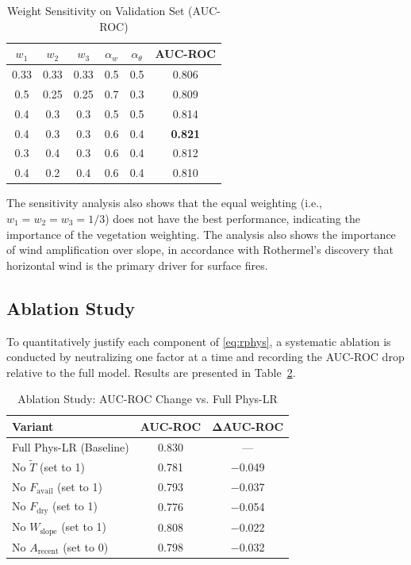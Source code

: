 \documentclass[conference]{IEEEtran}
\begin{document}
\begin{table}[h]
\caption{Weight Sensitivity on Validation Set (AUC-ROC)}
\label{tab:weights}
\centering
\small
\begin{tabular}{|c|c|c|c|c|c|}
\hline
$w_1$ & $w_2$ & $w_3$ & $\alpha_w$ & $\alpha_\theta$ & \textbf{AUC-ROC} \\
\hline
0.33 & 0.33 & 0.33 & 0.5 & 0.5 & 0.806 \\
0.5  & 0.25 & 0.25 & 0.7 & 0.3 & 0.809 \\
0.4  & 0.3  & 0.3  & 0.5 & 0.5 & 0.814 \\
0.4  & 0.3  & 0.3  & 0.6 & 0.4 & \textbf{0.821} \\
0.3  & 0.4  & 0.3  & 0.6 & 0.4 & 0.812 \\
0.4  & 0.2  & 0.4  & 0.6 & 0.4 & 0.810 \\
\hline
\end{tabular}
\end{table}

The sensitivity analysis also shows that the equal weighting (i.e., $w_1 = w_2 = w_3 = 1/3$) does not have the best performance, indicating the importance of the vegetation weighting. The analysis also shows the importance of wind amplification over slope, in accordance with Rothermel's discovery that horizontal wind is the primary driver for surface fires.

\subsection{Ablation Study}

To quantitatively justify each component of \eqref{eq:rphys}, a systematic ablation is conducted by neutralizing one factor at a time and recording the AUC-ROC drop relative to the full model. Results are presented in Table~\ref{tab:ablation}.

\begin{table}[h]
\caption{Ablation Study: AUC-ROC Change vs. Full Phys-LR}
\label{tab:ablation}
\centering
\small
\begin{tabular}{|l|c|c|}
\hline
\textbf{Variant} & \textbf{AUC-ROC} & $\boldsymbol{\Delta}$\textbf{AUC-ROC} \\
\hline
Full Phys-LR (Baseline)        & 0.830 & --- \\
No $\tilde{T}$ (set to 1)      & 0.781 & $-$0.049 \\
No $F_{\mathrm{avail}}$ (set to 1) & 0.793 & $-$0.037 \\
No $F_{\mathrm{dry}}$ (set to 1)   & 0.776 & $-$0.054 \\
No $W_{\mathrm{slope}}$ (set to 1) & 0.808 & $-$0.022 \\
No $A_{\mathrm{recent}}$ (set to 0) & 0.798 & $-$0.032 \\
\hline
\end{tabular}
\end{table}
\end{document}
